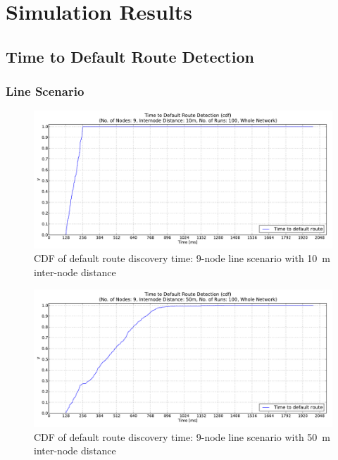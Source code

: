 \chapter{Simulation Results}

\section{Time to Default Route Detection}
\label{Appx:cdf}
\subsection{Line Scenario}
\label{Appx:cdf:line}
\begin{figure}[htpb]
  \begin{center}
    \leavevmode
      \includegraphics[scale=0.38]
      {Pics/results/9/MRHOF/line/dist10_montecarlo_cdf_hist.pdf}
   \caption{CDF of default route discovery time: 9-node line scenario with 10~m inter-node distance}
   \label{fig:9_MRHOF_line_10_cdf}
  \end{center}
\end{figure}

\begin{figure}[htpb]
  \begin{center}
    \leavevmode
        \includegraphics[scale=0.38]
      {Pics/results/9/MRHOF/line/dist50_montecarlo_cdf_hist.pdf}
   \caption{CDF of default route discovery time: 9-node line scenario with 50~m inter-node distance}
   \label{fig:9_MRHOF_line_50_cdf}
  \end{center}
\end{figure}

